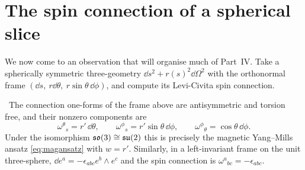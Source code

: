 \section{The spin connection of a spherical slice}

We now come to an observation that will organise much of Part~IV. Take a spherically symmetric three-geometry $\dd s^2+r(s)^2\dd\Omega^2$ with the orthonormal frame $(\dd s,\ r\dd\theta,\ r\sin\theta\,\dd\phi)$, and compute its Levi-Civita spin connection.

\begin{theorem}\label{thm:spinwitten}\ver\
The connection one-forms of the frame above are antisymmetric and torsion free, and their nonzero components are
\[
\omega^\theta{}_s=r'\,\dd\theta,\qquad \omega^\phi{}_s=r'\sin\theta\,\dd\phi,\qquad \omega^\phi{}_\theta=\cos\theta\,\dd\phi .
\]
Under the isomorphism $\mathfrak{so}(3)\cong\mathfrak{su}(2)$ this is precisely the magnetic Yang--Mills ansatz \eqref{eq:magansatz} with $w=r'$. Similarly, in a left-invariant frame on the unit three-sphere, $\dd e^a=-\epsilon_{abc}e^b\wedge e^c$ and the spin connection is $\omega^a{}_{bc}=-\epsilon_{abc}$.
\end{theorem}

